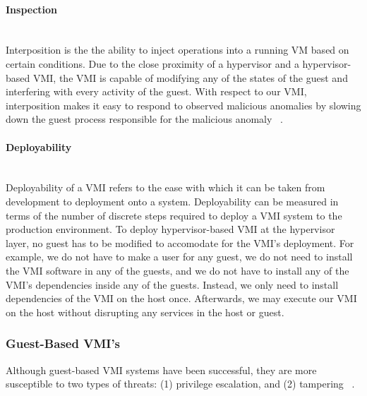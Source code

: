 \documentclass{report}
\begin{document}
\begin{spacing}{1.5}
\paragraph{Inspection}\mbox{}\\

{\large
Interposition is the the ability to inject operations into a running VM based on certain conditions. Due to the close proximity of a hypervisor and a hypervisor-based VMI, the VMI is capable of modifying any of the states of the guest and interfering with every activity of the guest. With respect to our VMI, interposition makes it easy to respond to observed malicious anomalies by slowing down the guest process responsible for the malicious anomaly ~\cite{hebbal2015virtual}.
\newline
}


\paragraph{Deployability}\mbox{}\\

{\large
Deployability of a VMI refers to the ease with which it can be taken from development to deployment onto a system. Deployability can be measured in terms of the number of discrete steps required to deploy a VMI system to the production environment. To deploy hypervisor-based VMI at the hypervisor layer, no guest has to be modified to accomodate for the VMI's deployment. For example, we do not have to make a user for any guest, we do not need to install the VMI software in any of the guests, and we do not have to install any of the VMI's dependencies inside any of the guests. Instead, we only need to install dependencies of the VMI on the host once. Afterwards, we may execute our VMI on the host without disrupting any services in the host or guest.
\newline
}


\subsubsection{Guest-Based VMI's}

{\large
Although guest-based VMI systems have been successful, they are more susceptible to two types of threats: (1) privilege escalation, and (2) tampering ~\cite{pfoh2009formal}. 
\newline
}


\end{spacing}
\end{document}
